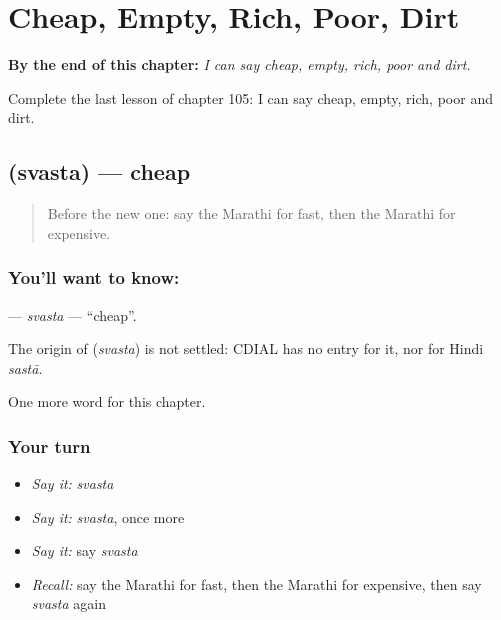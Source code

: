 
\chapter{Cheap, Empty, Rich, Poor, Dirt}
\label{ch:mr-cheap-empty-rich-poor-dirt}

\begin{chapteropening}
\textbf{By the end of this chapter:} \emph{I can say cheap, empty, rich, poor and dirt.}

Complete the last lesson of chapter 105: I can say cheap, empty, rich, poor and dirt.
\end{chapteropening}

\section[\texorpdfstring{\mr{स्वस्त} (svasta)}{स्वस्त (svasta)}]{ (svasta) — cheap}

\label{lesson:MR-C105-svasta}



\begin{quote}
Before the new one: say the Marathi for fast, then the Marathi for expensive.
\end{quote}

\subsection*{You'll want to know: }
\textbf{} — \emph{svasta} — \textquotedblleft{}cheap\textquotedblright{}.

\begin{cousinweb}
The origin of \textbf{} (\emph{svasta}) is not settled: CDIAL has no entry for it, nor for Hindi \emph{sastā}.
\end{cousinweb}

\begin{grammarlens}[title={What you've built}]
One more word for this chapter.
\end{grammarlens}

\subsection*{Your turn}
\begin{itemize}
\raggedright
  \item \emph{Say it:} \emph{svasta}
  \item \emph{Say it:} \emph{svasta}, once more
  \item \emph{Say it:} say \emph{svasta}
  \item \emph{Recall:} say the Marathi for fast, then the Marathi for expensive, then say \emph{svasta} again
\end{itemize}


